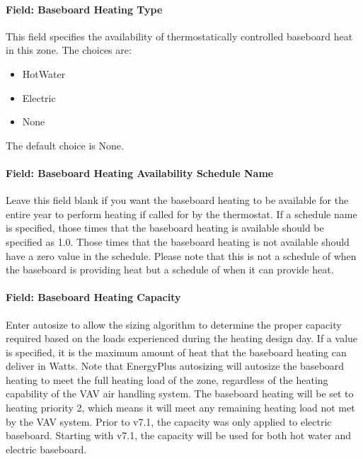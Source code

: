 \paragraph{Field: Baseboard Heating Type}\label{field-baseboard-heating-type-7}

This field specifies the availability of thermostatically controlled baseboard heat in this zone. The choices are:

\begin{itemize}
\item
  HotWater
\item
  Electric
\item
  None
\end{itemize}

The default choice is None.

\paragraph{Field: Baseboard Heating Availability Schedule Name}\label{field-baseboard-heating-availability-schedule-name-7}

Leave this field blank if you want the baseboard heating to be available for the entire year to perform heating if called for by the thermostat. If a schedule name is specified, those times that the baseboard heating is available should be specified as 1.0. Those times that the baseboard heating is not available should have a zero value in the schedule. Please note that this is not a schedule of when the baseboard is providing heat but a schedule of when it can provide heat.

\paragraph{Field: Baseboard Heating Capacity}\label{field-baseboard-heating-capacity-7}

Enter autosize to allow the sizing algorithm to determine the proper capacity required based on the loads experienced during the heating design day. If a value is specified, it is the maximum amount of heat that the baseboard heating can deliver in Watts. Note that EnergyPlus autosizing will autosize the baseboard heating to meet the full heating load of the zone, regardless of the heating capability of the VAV air handling system. The baseboard heating will be set to heating priority 2, which means it will meet any remaining heating load not met by the VAV system. Prior to v7.1, the capacity was only applied to electric baseboard. Starting with v7.1, the capacity will be used for both hot water and electric baseboard.

